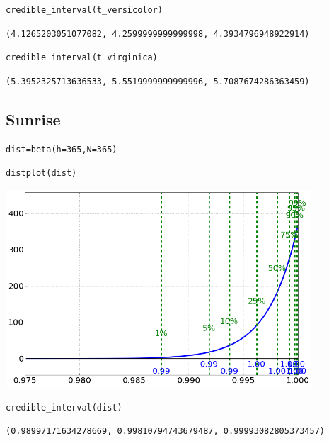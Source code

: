 \begin{lstlisting}
credible_interval(t_versicolor)
\end{lstlisting}

\begin{verbatim}
(4.1265203051077082, 4.2599999999999998, 4.3934796948922914)
\end{verbatim}

\begin{lstlisting}
credible_interval(t_virginica)
\end{lstlisting}

\begin{verbatim}
(5.3952325713636533, 5.5519999999999996, 5.7087674286363459)
\end{verbatim}

\subsection{Sunrise}


\begin{lstlisting}
dist=beta(h=365,N=365)
\end{lstlisting}

\begin{lstlisting}
distplot(dist)
\end{lstlisting}

\begin{center}\includegraphics[width=4.5in]{Applications_of_Parameter_Estimation/Applications_of_Parameter_Estimation_fig2.png}\end{center}

\begin{lstlisting}
credible_interval(dist)
\end{lstlisting}

\begin{verbatim}
(0.98997171634278669, 0.99810794743679487, 0.99993082805373457)
\end{verbatim}

